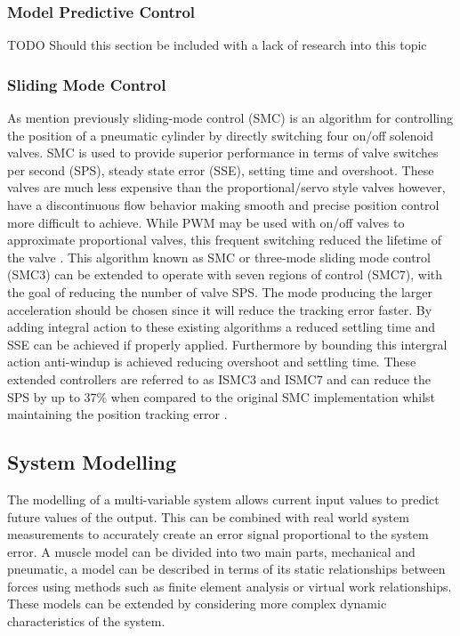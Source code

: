 \documentclass[11pt,a4paper]{article}
\begin{document}
\subsubsection{Model Predictive Control}
\label{sub:model_predictive_control}
TODO Should this section be included with a lack of research into this topic

\subsubsection{Sliding Mode Control}
\label{sub:sliding_mode_control}
As mention previously sliding-mode control (SMC) is an algorithm for controlling the position of a pneumatic cylinder by directly switching four on/off solenoid valves. SMC is used to provide superior performance in terms of valve switches per second (SPS), steady state error (SSE), setting time and overshoot. These valves are much less expensive than the proportional/servo style valves however, have a discontinuous flow behavior making smooth and precise position control more difficult to achieve. While PWM may be used with on/off valves to approximate proportional valves, this frequent switching reduced the lifetime of the valve \cite{zhang_bone_2018}. \newline
This algorithm known as SMC or three-mode sliding mode control (SMC3) can be extended to operate with seven regions of control (SMC7), with the goal of reducing the number of valve SPS. The mode producing the larger acceleration should be chosen since it will reduce the tracking error faster. By adding integral action to these existing algorithms a reduced settling time and SSE can be achieved if properly applied. Furthermore by bounding this intergral action anti-windup is achieved reducing overshoot and settling time. These extended controllers are referred to as ISMC3 and ISMC7 and can reduce the SPS by up to 37\% when compared to the original SMC implementation whilst maintaining the position tracking error \cite{zhang_bone_2018}.

\subsection{System Modelling}
\label{sub:system_modelling}
The modelling of a multi-variable system allows current input values to predict future values of the output. This can be combined with real world system measurements to accurately create an error signal proportional to the system error. A muscle model can be divided into two main parts, mechanical and pneumatic, a model can be described in terms of its static relationships between forces using methods such as finite element analysis or virtual work relationships. These models can be extended by considering more complex dynamic characteristics of the system.
\end{document}
